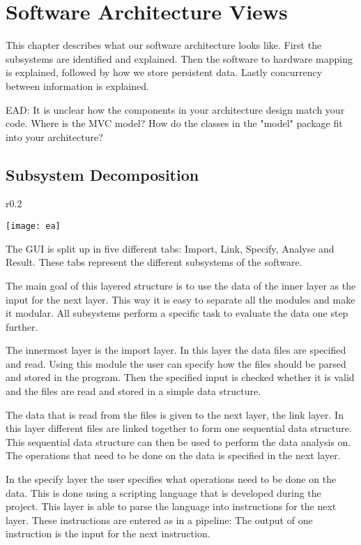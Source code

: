 \documentclass[a4paper,english,fleqn]{exam}
\begin{document}
\section{Software Architecture Views}
This chapter describes what our software architecture looks like. First the subsystems are identified and explained. Then the software to hardware mapping is explained, followed by how we store persistent data. Lastly concurrency between information is explained.


EAD: It is unclear how the components in your architecture design match your code. Where is the MVC model? How do the classes in the "model" package fit into your architecture?

\subsection{Subsystem Decomposition}

\begin{wrapfigure}{r}{0.2\textwidth}
  \begin{center}
    \texttt{[image: ea]}
  \end{center}
\end{wrapfigure}

The GUI is split up in five different tabs: Import, Link, Specify, Analyse and Result. These tabs represent the different subsystems of the software.

The main goal of this layered structure is to use the data of the inner layer as the input for the next layer. This way it is easy to separate all the modules and make it modular. All subsystems perform a specific task to evaluate the data one step further.

The innermost layer is the import layer. In this layer the data files are specified and read. Using this module the user can specify how the files should be parsed and stored in the program. Then the specified input is checked whether it is valid and the files are read and stored in a simple data structure. 

The data that is read from the files is given to the next layer, the link layer. In this layer different files are linked together to form one sequential data structure. This sequential data structure can then be used to perform the data analysis on. The operations that need to be done on the data is specified in the next layer.

In the specify layer the user specifies what operations need to be done on the data. This is done using a scripting language that is developed during the project. This layer is able to parse the language into instructions for the next layer. These instructions are entered as in a pipeline: The output of one instruction is the input for the next instruction. 
\end{document}
